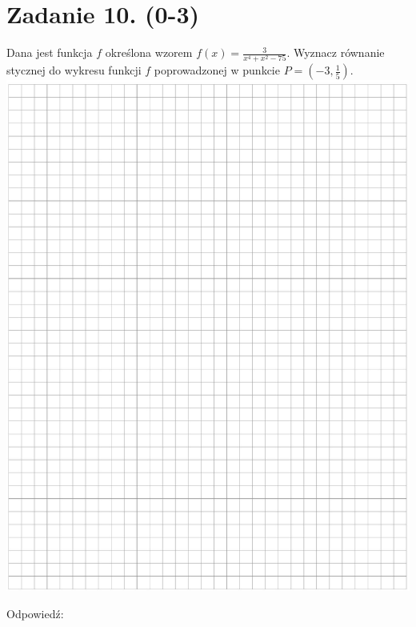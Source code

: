 \documentclass[10pt]{article}
\begin{document}
\section*{Zadanie 10. (0-3)}
Dana jest funkcja \(f\) określona wzorem \(f(x)=\frac{3}{x^{4}+x^{2}-75}\). Wyznacz równanie stycznej do wykresu funkcji \(f\) poprowadzonej w punkcie \(P=\left(-3, \frac{1}{5}\right)\).\\
\includegraphics[max width=\textwidth, center]{2024_11_21_c0ca116654784d42326bg-07}

Odpowiedź:
\end{document}
